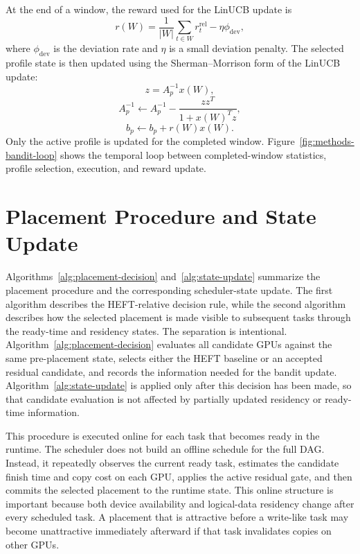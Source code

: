 At the end of a window, the reward used for the LinUCB update is
\begin{equation}
r(W)
=
\frac{1}{|W|}\sum_{t\in W}r_t^{\mathrm{rel}}
-
\eta\phi_{\mathrm{dev}},
\label{eq:window-reward}
\end{equation}
where $\phi_{\mathrm{dev}}$ is the deviation rate and $\eta$ is a small deviation penalty. The selected profile state is then updated using the Sherman--Morrison form of the LinUCB update:
\begin{equation}
z=A_p^{-1}x(W),
\end{equation}
\begin{equation}
A_p^{-1}
\leftarrow
A_p^{-1}
-
\frac{zz^T}{1+x(W)^Tz},
\end{equation}
\begin{equation}
b_p\leftarrow b_p+r(W)x(W).
\end{equation}
Only the active profile is updated for the completed window. Figure~\ref{fig:methods-bandit-loop} shows the temporal loop between completed-window statistics, profile selection, execution, and reward update.

\figMethodsBanditLoop

\section{Placement Procedure and State Update}
\label{sec:methods-placement-procedure}

Algorithms~\ref{alg:placement-decision} and~\ref{alg:state-update} summarize the placement procedure and the corresponding scheduler-state update. The first algorithm describes the HEFT-relative decision rule, while the second algorithm describes how the selected placement is made visible to subsequent tasks through the ready-time and residency states. The separation is intentional. Algorithm~\ref{alg:placement-decision} evaluates all candidate GPUs against the same pre-placement state, selects either the HEFT baseline or an accepted residual candidate, and records the information needed for the bandit update. Algorithm~\ref{alg:state-update} is applied only after this decision has been made, so that candidate evaluation is not affected by partially updated residency or ready-time information.

This procedure is executed online for each task that becomes ready in the \CUDASTF{} runtime. The scheduler does not build an offline schedule for the full DAG. Instead, it repeatedly observes the current ready task, estimates the candidate finish time and copy cost on each GPU, applies the active residual gate, and then commits the selected placement to the runtime state. This online structure is important because both device availability and logical-data residency change after every scheduled task. A placement that is attractive before a write-like task may become unattractive immediately afterward if that task invalidates copies on other GPUs.

